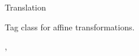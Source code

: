 \begin{ccRefClass}{Translation}

\ccDefinition
Tag class for affine transformations.

\ccSeeAlso
{}, 
\end{ccRefClass}

